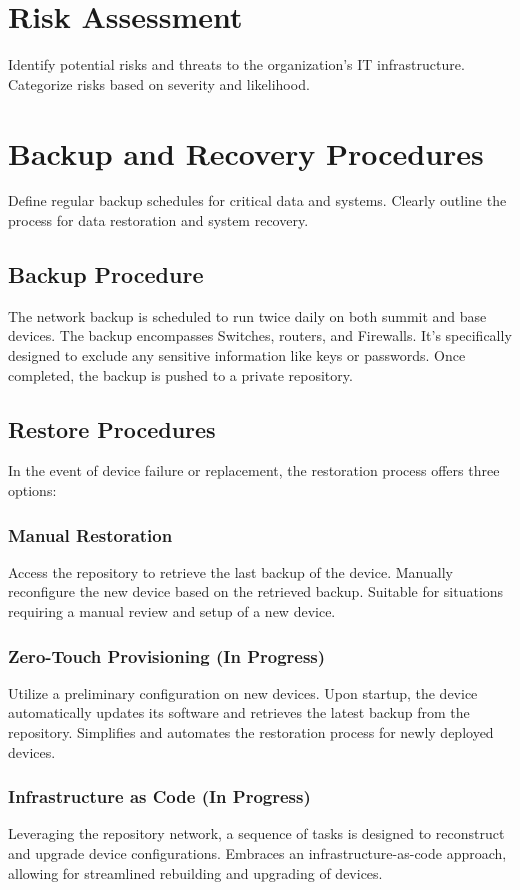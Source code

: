\section{Risk Assessment}

Identify potential risks and threats to the organization's IT infrastructure.
Categorize risks based on severity and likelihood.

\section{Backup and Recovery Procedures}
Define regular backup schedules for critical data and systems.
Clearly outline the process for data restoration and system recovery.

\subsection{Backup Procedure}
The network backup is scheduled to run twice daily on both summit and base devices. The backup encompasses Switches, routers, and Firewalls. It's specifically designed to exclude any sensitive information like keys or passwords. Once completed, the backup is pushed to a private repository.

\subsection{Restore Procedures}
In the event of device failure or replacement, the restoration process offers three options:

\subsubsection{Manual Restoration}
Access the repository to retrieve the last backup of the device.
Manually reconfigure the new device based on the retrieved backup.
Suitable for situations requiring a manual review and setup of a new device.

\subsubsection{Zero-Touch Provisioning (In Progress)}
Utilize a preliminary configuration on new devices.
Upon startup, the device automatically updates its software and retrieves the latest backup from the repository.
Simplifies and automates the restoration process for newly deployed devices.

\subsubsection{Infrastructure as Code (In Progress)}
Leveraging the repository network, a sequence of tasks is designed to reconstruct and upgrade device configurations.
Embraces an infrastructure-as-code approach, allowing for streamlined rebuilding and upgrading of devices.

